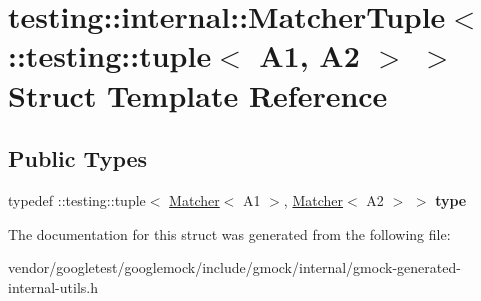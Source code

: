\hypertarget{structtesting_1_1internal_1_1_matcher_tuple_3_01_1_1testing_1_1tuple_3_01_a1_00_01_a2_01_4_01_4}{}\section{testing\+:\+:internal\+:\+:Matcher\+Tuple$<$ \+:\+:testing\+:\+:tuple$<$ A1, A2 $>$ $>$ Struct Template Reference}
\label{structtesting_1_1internal_1_1_matcher_tuple_3_01_1_1testing_1_1tuple_3_01_a1_00_01_a2_01_4_01_4}
\subsection*{Public Types}
\begin{DoxyCompactItemize}
\item 
\mbox{\label{structtesting_1_1internal_1_1_matcher_tuple_3_01_1_1testing_1_1tuple_3_01_a1_00_01_a2_01_4_01_4_a0ba88406203fde086f85abbf68ce2924}} 
typedef \+::testing\+::tuple$<$ \hyperlink{classtesting_1_1_matcher}{Matcher}$<$ A1 $>$, \hyperlink{classtesting_1_1_matcher}{Matcher}$<$ A2 $>$ $>$ {\bfseries type}
\end{DoxyCompactItemize}


The documentation for this struct was generated from the following file\+:\begin{DoxyCompactItemize}
\item 
vendor/googletest/googlemock/include/gmock/internal/gmock-\/generated-\/internal-\/utils.\+h\end{DoxyCompactItemize}

